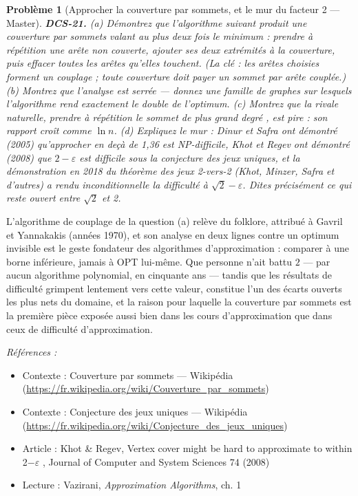 \documentclass[11pt]{article}
\newtheorem{problem}{Problème}
\newenvironment{refs}{\par\small\noindent\emph{Références :}\begin{itemize}\setlength\itemsep{0pt}}{\end{itemize}\normalsize}
\begin{document}
\bigskip

\begin{problem}[{Approcher la couverture par sommets, et le mur du facteur 2 --- Master}]
\textbf{DCS-21.} (a) Démontrez que l'algorithme suivant produit une couverture par sommets valant au plus deux fois le minimum : prendre à répétition une arête non couverte, ajouter ses \textit{deux} extrémités à la couverture, puis effacer toutes les arêtes qu'elles touchent. (La clé : les arêtes choisies forment un couplage ; toute couverture doit payer un sommet par arête couplée.) (b) Montrez que l'analyse est serrée --- donnez une famille de graphes sur lesquels l'algorithme rend exactement le double de l'optimum. (c) Montrez que la rivale naturelle, \og{} prendre à répétition le sommet de plus grand degré \fg{}, est \textit{pire} : son rapport croît comme $\ln n$. (d) Expliquez le mur : Dinur et Safra ont démontré (2005) qu'approcher en deçà de 1,36 est NP-difficile, Khot et Regev ont démontré (2008) que $2 - \varepsilon$ est difficile sous la conjecture des jeux uniques, et la démonstration en 2018 du théorème des jeux 2-vers-2 (Khot, Minzer, Safra et d'autres) a rendu inconditionnelle la difficulté à $\sqrt{2} - \varepsilon$. Dites précisément ce qui reste ouvert entre $\sqrt{2}$ et 2.
\end{problem}

\noindent L'algorithme de couplage de la question (a) relève du folklore, attribué à Gavril et Yannakakis (années 1970), et son analyse en deux lignes contre un optimum invisible est le geste fondateur des algorithmes d'approximation : comparer à une borne inférieure, jamais à OPT lui-même. Que personne n'ait battu $2$ --- par aucun algorithme polynomial, en cinquante ans --- tandis que les résultats de difficulté grimpent lentement vers cette valeur, constitue l'un des écarts ouverts les plus nets du domaine, et la raison pour laquelle la couverture par sommets est la première pièce exposée aussi bien dans les cours d'approximation que dans ceux de difficulté d'approximation.

\begin{refs}
\item Contexte : Couverture par sommets --- Wikipédia (\url{https://fr.wikipedia.org/wiki/Couverture_par_sommets})
\item Contexte : Conjecture des jeux uniques --- Wikipédia (\url{https://fr.wikipedia.org/wiki/Conjecture_des_jeux_uniques})
\item Article : Khot \& Regev, \og{} Vertex cover might be hard to approximate to within 2$-$$\varepsilon$ \fg{}, Journal of Computer and System Sciences 74 (2008)
\item Lecture : Vazirani, \textit{Approximation Algorithms}, ch. 1
\end{refs}
\end{document}

